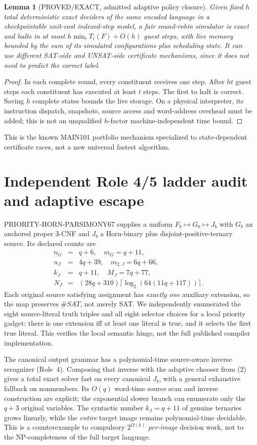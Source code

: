 \documentclass[11pt]{article}
\newtheorem{lemma}{Lemma}
\begin{document}
\begin{lemma}[PROVED/EXACT, admitted adaptive policy closure]
Given fixed $h$ total deterministic exact deciders of the same encoded
language in a checkpointable unit-cost indexed-step model, a fair
round-robin simulator is exact and halts in at most
$h\min_i T_i(F)+O(h)$ guest steps, with live memory bounded by
the sum of its simulated configurations plus scheduling state.
It can use different SAT-side and UNSAT-side certificate mechanisms,
since it does not need to predict the correct label.
\end{lemma}
\begin{proof}
In each complete round, every constituent receives one step.
After $h t$ guest steps each constituent has executed at least $t$
steps. The first to halt is correct. Saving $h$ complete states
bounds the live storage. On a physical interpreter, its instruction
dispatch, snapshots, source access and word-address overhead must
be added; this is not an unqualified $h$-factor machine-independent
time bound.
\end{proof}
This is the known MAIN101 portfolio mechanism specialized to
state-dependent certificate races, not a new universal fastest algorithm.

\section{Independent Role 4/5 ladder audit and adaptive escape}
PRIORITY-HORN-PARSIMONY67 supplies a uniform $F_b\mapsto G_b\mapsto J_b$
with $G_b$ an anchored proper 3-CNF and $J_b$ a Horn-binary
plus disjoint-positive-ternary source. Its declared counts are
\[
\begin{array}{rcl}
 n_G&=&q+6,\quad m_G=q+11,\\
 n_J&=&4q+39,\quad m_{2,J}=6q+66,\\
 k_J&=&q+11,\quad M_J=7q+77,\\
 N_J&=&(28q+310)\lceil\log_2(64(11q+117))\rceil.
\end{array}
\tag{3}
\]
Each original source satisfying assignment has \emph{exactly one}
auxiliary extension, so the map preserves $\#SAT$, not merely SAT.
We independently enumerated the eight source-literal truth triples
and all eight selector choices for a local priority gadget:
there is one extension iff at least one literal is true, and it
selects the first true literal. This verifies the local semantic
hinge, not the full published compiler implementation.

The canonical output grammar has a polynomial-time source-aware inverse
recognizer (Role~4). Composing that inverse with the adaptive chooser
from (2) gives a total exact solver fast on every canonical $J_b$,
with a general exhaustive fallback on nonmembers. Its $O(q)$
word-time source scan and inverse construction are explicit; the
exponential slower branch can enumerate only the $q+3$ original
variables. The syntactic number $k_J=q+11$ of genuine ternaries
grows linearly, while the \emph{entire} target image remains
polynomial-time decidable. This is a counterexample to compulsory
$2^{\Omega(k)}$ \emph{per-image} decision work, not to the NP-completeness
of the full target language.
\end{document}
